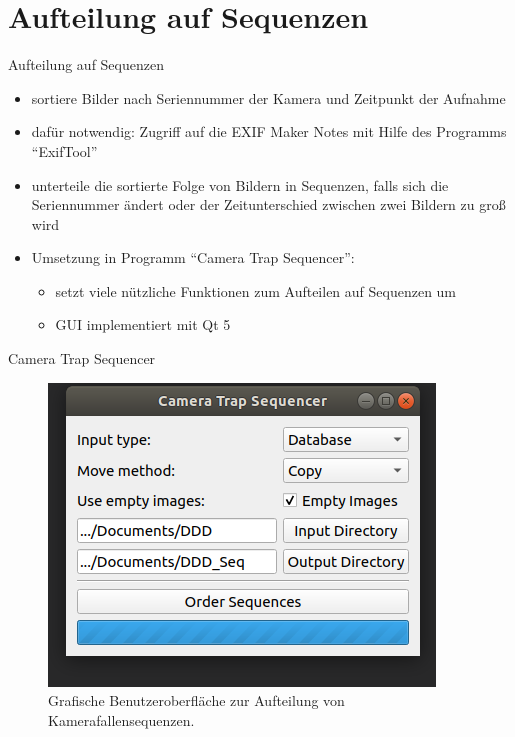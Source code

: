 \section{Aufteilung auf Sequenzen}

\begin{frame}[t,fragile]{Aufteilung auf Sequenzen}
	\begin{itemize}
		\item sortiere Bilder nach Seriennummer der Kamera und Zeitpunkt der Aufnahme
		\item dafür notwendig: Zugriff auf die EXIF Maker Notes mit Hilfe des Programms \enquote{ExifTool} \cite{exif}
		\item unterteile die sortierte Folge von Bildern in Sequenzen, falls sich die Seriennummer ändert oder der Zeitunterschied zwischen zwei Bildern zu groß wird
		\item Umsetzung in Programm \enquote{Camera Trap Sequencer}:
			\begin{itemize}
				\item setzt viele nützliche Funktionen zum Aufteilen auf Sequenzen um
				\item GUI implementiert mit Qt 5
			\end{itemize}
	\end{itemize}
\end{frame}

\begin{frame}[t, fragile]{Camera Trap Sequencer}
	\begin{figure}
	\centering
	\includegraphics[scale=0.5]{img/CameraTrapSequencer.png}
	\caption{Grafische Benutzeroberfläche zur Aufteilung von Kamerafallensequenzen.}
	\end{figure}
\end{frame}